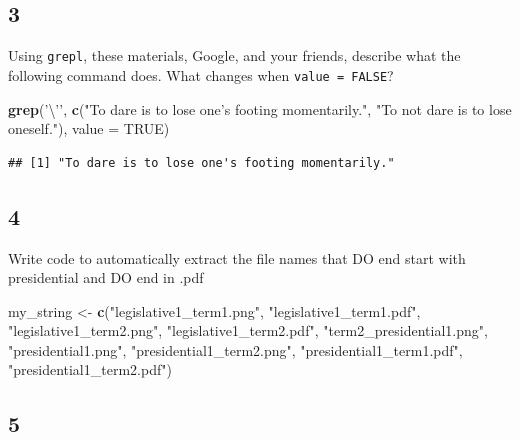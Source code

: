 \documentclass[]{book}
\newenvironment{Shaded}{\begin{snugshade}}{\end{snugshade}}
\newcommand{\KeywordTok}[1]{\textcolor[rgb]{0.13,0.29,0.53}{\textbf{#1}}}
\newcommand{\DataTypeTok}[1]{\textcolor[rgb]{0.13,0.29,0.53}{#1}}
\newcommand{\CharTok}[1]{\textcolor[rgb]{0.31,0.60,0.02}{#1}}
\newcommand{\StringTok}[1]{\textcolor[rgb]{0.31,0.60,0.02}{#1}}
\newcommand{\OtherTok}[1]{\textcolor[rgb]{0.56,0.35,0.01}{#1}}
\newcommand{\NormalTok}[1]{#1}
\theoremstyle{definition}
\theoremstyle{definition}
\theoremstyle{definition}
\theoremstyle{remark}
\begin{document}
\subsection*{3}\label{section-19}

Using \texttt{grepl}, these materials, Google, and your friends,
describe what the following command does. What changes when
\texttt{value\ =\ FALSE}?

\begin{Shaded}
\begin{Highlighting}[]
\KeywordTok{grep}\NormalTok{(}\StringTok{'}\CharTok{\textbackslash{}'}\StringTok{'}\NormalTok{, }
     \KeywordTok{c}\NormalTok{(}\StringTok{"To dare is to lose one's footing momentarily."}\NormalTok{,  }\StringTok{"To not dare is to lose oneself."}\NormalTok{), }\DataTypeTok{value =} \OtherTok{TRUE}\NormalTok{)}
\end{Highlighting}
\end{Shaded}

\begin{verbatim}
## [1] "To dare is to lose one's footing momentarily."
\end{verbatim}

\subsection*{4}\label{section-20}

Write code to automatically extract the file names that DO end start
with presidential and DO end in .pdf

\begin{Shaded}
\begin{Highlighting}[]
\NormalTok{my_string <-}\StringTok{ }\KeywordTok{c}\NormalTok{(}\StringTok{"legislative1_term1.png"}\NormalTok{, }
               \StringTok{"legislative1_term1.pdf"}\NormalTok{,}
               \StringTok{"legislative1_term2.png"}\NormalTok{, }
               \StringTok{"legislative1_term2.pdf"}\NormalTok{,}
               \StringTok{"term2_presidential1.png"}\NormalTok{, }
               \StringTok{"presidential1.png"}\NormalTok{, }
               \StringTok{"presidential1_term2.png"}\NormalTok{,}
               \StringTok{"presidential1_term1.pdf"}\NormalTok{,}
               \StringTok{"presidential1_term2.pdf"}\NormalTok{)}
\end{Highlighting}
\end{Shaded}

\subsection*{5}\label{section-21}
\end{document}

